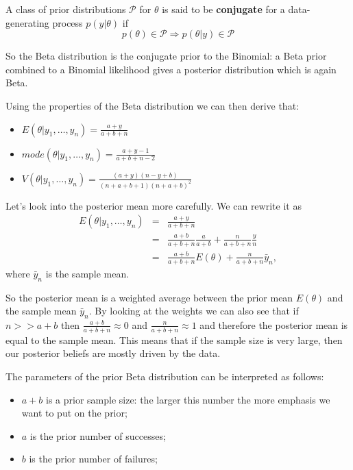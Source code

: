 \documentclass[
]{book}
\begin{document}
A class of prior distributions \(\mathcal{P}\) for \(\theta\) is said to be \textbf{conjugate} for a data-generating process \(p(y|\theta)\) if
\[
p(\theta)\in\mathcal{P}\Rightarrow p(\theta|y)\in\mathcal{P}
\]

So the Beta distribution is the conjugate prior to the Binomial: a Beta prior combined to a Binomial likelihood gives a posterior distribution which is again Beta.

Using the properties of the Beta distribution we can then derive that:

\begin{itemize}
\item
  \(E(\theta|y_1,\dots,y_n)=\frac{a+y}{a+b+n}\)
\item
  \(mode(\theta|y_1,\dots,y_n)=\frac{a+y-1}{a+b+n-2}\)
\item
  \(V(\theta|y_1,\dots,y_n)=\frac{(a+y)(n-y+b)}{(n+a+b+1)(n+a+b)^2}\)
\end{itemize}

Let's look into the posterior mean more carefully. We can rewrite it as
\begin{eqnarray*}
E(\theta|y_1,\dots,y_n)&=&\frac{a+y}{a+b+n}\\
 & = & \frac{a+b}{a+b+n}\frac{a}{a+b} + \frac{n}{a+b+n}\frac{y}{n}\\
 & = & \frac{a+b}{a+b+n}E(\theta) + \frac{n}{a+b+n}\bar{y}_n,
\end{eqnarray*}
where \(\bar{y}_n\) is the sample mean.

So the posterior mean is a weighted average between the prior mean \(E(\theta)\) and the sample mean \(\bar{y}_n\). By looking at the weights we can also see that if \(n >> a+b\) then \(\frac{a+b}{a+b+n}\approx 0\) and \(\frac{n}{a+b+n}\approx 1\) and therefore the posterior mean is equal to the sample mean. This means that if the sample size is very large, then our posterior beliefs are mostly driven by the data.

The parameters of the prior Beta distribution can be interpreted as follows:

\begin{itemize}
\item
  \(a+b\) is a prior sample size: the larger this number the more emphasis we want to put on the prior;
\item
  \(a\) is the prior number of successes;
\item
  \(b\) is the prior number of failures;
\end{itemize}
\end{document}
